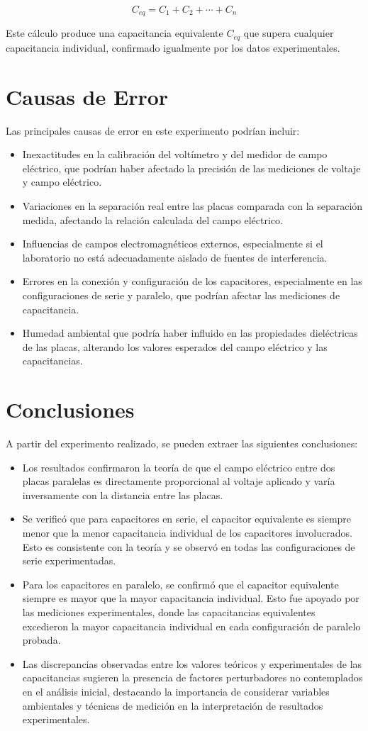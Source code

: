 \[
C_{eq} = C_1 + C_2 + \cdots + C_n
\]

Este cálculo produce una capacitancia equivalente \( C_{eq} \) que supera cualquier capacitancia individual, confirmado igualmente por los datos experimentales.

\section{Causas de Error}
Las principales causas de error en este experimento podrían incluir:
\begin{itemize}
    \item Inexactitudes en la calibración del voltímetro y del medidor de campo eléctrico, que podrían haber afectado la precisión de las mediciones de voltaje y campo eléctrico.
    \item Variaciones en la separación real entre las placas comparada con la separación medida, afectando la relación calculada del campo eléctrico.
    \item Influencias de campos electromagnéticos externos, especialmente si el laboratorio no está adecuadamente aislado de fuentes de interferencia.
    \item Errores en la conexión y configuración de los capacitores, especialmente en las configuraciones de serie y paralelo, que podrían afectar las mediciones de capacitancia.
    \item Humedad ambiental que podría haber influido en las propiedades dieléctricas de las placas, alterando los valores esperados del campo eléctrico y las capacitancias.
\end{itemize}

\section{Conclusiones}
A partir del experimento realizado, se pueden extraer las siguientes conclusiones:
\begin{itemize}
    \item Los resultados confirmaron la teoría de que el campo eléctrico entre dos placas paralelas es directamente proporcional al voltaje aplicado y varía inversamente con la distancia entre las placas.
    \item Se verificó que para capacitores en serie, el capacitor equivalente es siempre menor que la menor capacitancia individual de los capacitores involucrados. Esto es consistente con la teoría y se observó en todas las configuraciones de serie experimentadas.
    \item Para los capacitores en paralelo, se confirmó que el capacitor equivalente siempre es mayor que la mayor capacitancia individual. Esto fue apoyado por las mediciones experimentales, donde las capacitancias equivalentes excedieron la mayor capacitancia individual en cada configuración de paralelo probada.
    \item Las discrepancias observadas entre los valores teóricos y experimentales de las capacitancias sugieren la presencia de factores perturbadores no contemplados en el análisis inicial, destacando la importancia de considerar variables ambientales y técnicas de medición en la interpretación de resultados experimentales.
\end{itemize}